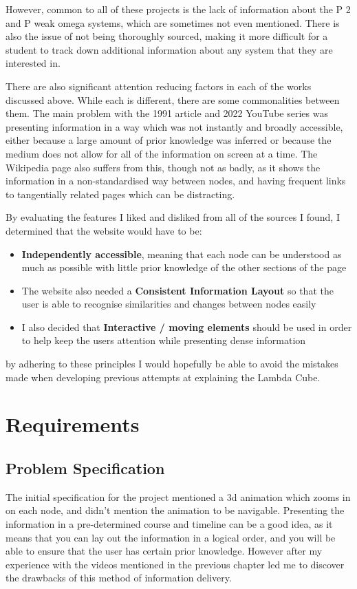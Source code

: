 \documentclass{l4proj}
\begin{document}
However, common to all of these projects is the lack of information about the P 2 and P weak omega systems, which are sometimes not even mentioned.  There is also the issue of not being thoroughly sourced, making it more difficult for a student to track down additional information about any system that they are interested in.

There are also significant attention reducing factors in each of the works discussed above.  While each is different, there are some commonalities between them.  The main problem with the 1991 article and 2022 YouTube series was presenting information in a way which was not instantly and broadly accessible, either because a large amount of prior knowledge was inferred or because the medium does not allow for all of the information on screen at a time.  The Wikipedia page also suffers from this, though not as badly, as it shows the information in a non-standardised way between nodes, and having frequent links to tangentially related pages which can be distracting.

By evaluating the features I liked and disliked from all of the sources I found, I determined that the website would have to be:

\begin{itemize}
    \item \textbf{Independently accessible}, meaning that each node can be understood as much as possible with little prior knowledge of the other sections of the page

    \item The website also needed a \textbf{Consistent Information Layout} so that the user is able to recognise similarities and changes between nodes easily

    \item I also decided that \textbf{Interactive / moving elements} should be used in order to help keep the users attention while presenting dense information
\end{itemize}

by adhering to these principles I would hopefully be able to avoid the mistakes made when developing previous attempts at explaining the Lambda Cube.
\chapter{Requirements}

\section{Problem Specification}
The initial specification for the project mentioned a 3d animation which zooms in on each node, and didn't mention the animation to be navigable.  Presenting the information in a pre-determined course and timeline can be a good idea, as it means that you can lay out the information in a logical order, and you will be able to ensure that the user has certain prior knowledge.  However after my experience with the videos mentioned in the previous chapter led me to discover the drawbacks of this method of information delivery.
\end{document}
